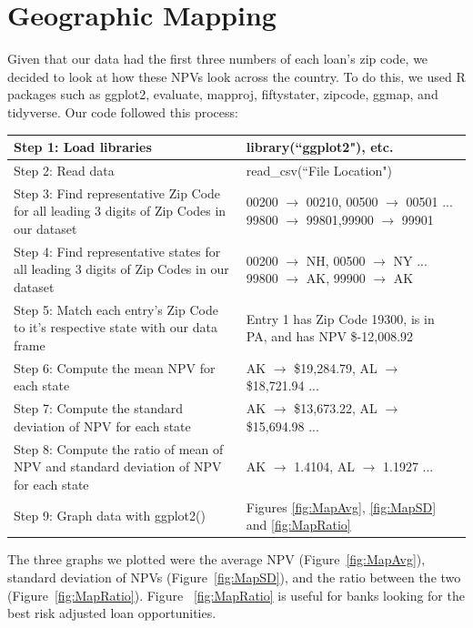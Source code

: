 \documentclass[12 pt]{uncw_thesis}
\theoremstyle{plain}
\theoremstyle{remark}
\theoremstyle{definition}
\begin{document}
\section{Geographic Mapping}
Given that our data had the first three numbers of each loan's zip code, we decided to look at how these NPVs look across the country. To do this, we used R packages such as ggplot2, evaluate, mapproj, fiftystater, zipcode, ggmap, and tidyverse. Our code followed this process:
\begin{center}
	\begin{tabular}{|M{6cm}|M{8cm}|} 
		\hline
		Step 1: Load libraries& library(``ggplot2"), etc.\\
		\hline
		Step 2: Read data & read\_csv(``File Location")\\
		\hline
		Step 3: Find representative Zip Code for all leading 3 digits of Zip Codes in our dataset&  00200 $\rightarrow$ 00210,  00500 $\rightarrow$ 00501 ... 99800 $\rightarrow$ 99801,99900 $\rightarrow$ 99901\\
		\hline
		Step 4: Find representative states for all leading 3 digits of Zip Codes in our dataset& 00200 $\rightarrow$ NH, 00500 $\rightarrow$ NY ... 99800 $\rightarrow$ AK, 99900 $\rightarrow$ AK\\
		\hline
		Step 5: Match each entry's Zip Code to it's respective state with our data frame& Entry 1 has Zip Code 19300, is in PA, and has NPV \$-12,008.92\\
		\hline
		Step 6: Compute the mean NPV for each state & AK $\rightarrow$ \$19,284.79, AL $\rightarrow$ \$18,721.94 ...\\ 
		\hline
		Step 7: Compute the standard deviation of NPV for each state & AK $\rightarrow$ \$13,673.22, AL $\rightarrow$ \$15,694.98 ...\\
		\hline
		Step 8: Compute the ratio of mean of NPV and standard deviation of NPV for each state & AK $\rightarrow$ 1.4104, AL $\rightarrow$ 1.1927 ...\\
		\hline
		Step 9: Graph data with ggplot2() & Figures \ref{fig:MapAvg}, \ref{fig:MapSD} and \ref{fig:MapRatio}\\
		\hline
	\end{tabular}
\end{center}
The three graphs we plotted were the average NPV (Figure~\ref{fig:MapAvg}), standard deviation of NPVs (Figure~\ref{fig:MapSD}), and the ratio between the two (Figure~\ref{fig:MapRatio}). Figure ~\ref{fig:MapRatio} is useful for banks looking for the best risk adjusted loan opportunities.
\end{document}
